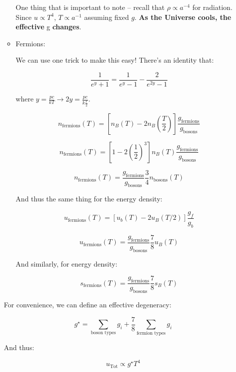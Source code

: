 \documentclass{article}
\newcommand{\be}{\begin{equation}}
\newcommand{\ee}{\end{equation}}
\begin{document}
\begin{itemize}
\begin{itemize}
        One thing that is important to note -- recall that $\rho \propto a^{-4}$ for radiation. Since $u\propto T^4$, $\boxed{T\propto a^{-1}}$ assuming fixed $g$. \textbf{As the Universe cools, the effective} g \textbf{changes}.
        
        \item Fermions:
        
        We can use one trick to make this easy! There's an identity that:
        
        \be
        \frac{1}{e^y + 1} = \frac{1}{e^y - 1} - \frac{2}{e^{2y}-1}
        \ee
        
        where $y = \frac{pc}{kT} \rightarrow 2y = \frac{pc}{k\frac{T}{2}}$.
        
        \be
        n_\text{fermions}(T) = \left[n_B(T) - 2n_B\left(\frac{T}{2}\right) \right]\frac{g_\text{fermions}}{g_\text{bosons}}
        \ee
        
        \be
        n_\text{fermions}(T) = \left[1-2\left(\frac12\right)^3\right] n_B(T) \frac{g_\text{fermions}}{g_\text{bosons}}
        \ee
        
        \be
        \boxed{n_\text{fermions}(T) = \frac{g_\text{fermions}}{g_\text{bosons}} \frac34 n_\text{bosons}(T) }
        \ee
        
        And thus the same thing for the energy density:
        
        \be
        u_\text{fermions}\left(T\right) = \left[u_b(T) - 2u_B\left(T/2\right)\right]\frac{g_f}{g_b}
        \ee
        
        \be
        \boxed{u_\text{fermions}\left(T\right) = \frac{g_\text{fermions}}{g_\text{bosons}} \frac78 u_B\left(T\right)}
        \ee
        
        And similarly, for energy density:
        
        \be
        \boxed{s_\text{fermions}\left(T\right) = \frac{g_\text{fermions}}{g_\text{bosons}} \frac78 s_B\left(T\right)}
        \ee
        
        
    \end{itemize}
    
    For convenience, we can define an effective degeneracy:
    
    \be
    \boxed{g^\star = \sum_\text{boson types} g_i + \frac78 \sum_\text{fermion types} g_i}
    \ee
    
    And thus:
    
    \be
    \boxed{u_\text{Tot} \propto g^\star T^4}
    \ee
    
    
\end{itemize}
\end{document}
